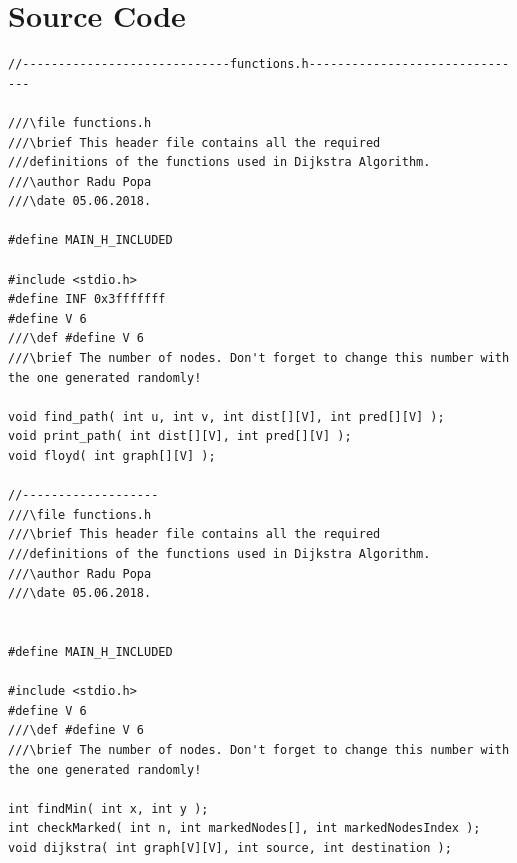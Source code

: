 \documentclass[14pt]{article}
\begin{document}
\section*{Source Code}
\begin{lstlisting}
//-----------------------------functions.h-------------------------------

///\file functions.h
///\brief This header file contains all the required
///definitions of the functions used in Dijkstra Algorithm.
///\author Radu Popa
///\date 05.06.2018.

#define MAIN_H_INCLUDED

#include <stdio.h>
#define INF 0x3fffffff
#define V 6
///\def #define V 6
///\brief The number of nodes. Don't forget to change this number with the one generated randomly!

void find_path( int u, int v, int dist[][V], int pred[][V] );
void print_path( int dist[][V], int pred[][V] );
void floyd( int graph[][V] );

//-------------------
///\file functions.h
///\brief This header file contains all the required
///definitions of the functions used in Dijkstra Algorithm.
///\author Radu Popa
///\date 05.06.2018.


#define MAIN_H_INCLUDED

#include <stdio.h>
#define V 6
///\def #define V 6
///\brief The number of nodes. Don't forget to change this number with the one generated randomly!

int findMin( int x, int y );
int checkMarked( int n, int markedNodes[], int markedNodesIndex );
void dijkstra( int graph[V][V], int source, int destination );



\end{lstlisting}
\end{document}
